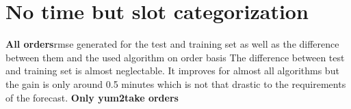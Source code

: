 \section{No time but slot categorization}\label{section:No time but slot categorization}
\begin{table}[h]
\centering
\caption{No time but slot categorization results}
\label{No time but slot categorization results}
\end{table}
\newline\newline\textbf{All orders}\newline
[] rmse generated for the test and training set as well as the difference between them and the used algorithm on order basis
The difference between test and training set is almost neglectable. It improves for almost all algorithms but the gain is only around 0.5 minutes which is not that drastic to the requirements of the forecast.
\newline\newline\textbf{Only yum2take orders}\newline

